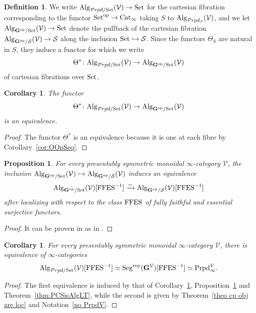 \documentclass{amsart}
\numberwithin{theorem}{subsection}
\newtheorem{propn}[theorem]{Proposition}
\newtheorem{cor}[theorem]{Corollary}
\theoremstyle{definition}
\newtheorem{defn}[theorem]{Definition}
\providecommand{\op}{\mathrm{op}}
\newcommand{\xS}{\mathcal{S}}
\newcommand{\xV}{\mathcal{V}}
\newcommand{\icat}{$\infty$-category}
\newcommand{\isoto}{\xrightarrow{\sim}}
\newcommand{\name}[1]{\ensuremath{\text{\textup{#1}}}}
\newcommand{\bbY}{\mathbf{G}}
\newcommand{\bbYV}{\bbY^{\xV}}
\newcommand{\Set}{\name{Set}}
\newcommand{\Seg}{\name{Seg}}
\newcommand{\Cat}{\name{Cat}}
\newcommand{\CatI}{\Cat_{\infty}}
\newcommand{\Alg}{\name{Alg}}
\newcommand{\AlgPrdSet}{\name{Alg}_{\mathcal{P}rpd/\Set}}
\newcommand{\Segrep}{\Seg^{\name{rep}}}
\newcommand{\calproperad}{\mathcal{P}rpd}
\newcommand{\nmproperad}{\name{Prpd}}
\begin{document}
\begin{defn}
We write $\AlgPrdSet(\xV) \to \Set$ for the cartesian fibration corresponding to the functor $\Set^{\op} \to \CatI$ taking $S$ to $\Alg_{\calproperad_{S}}(\xV)$, and we let $\Alg_{\bbY^\op/\Set}(\xV) \to \Set$ denote the pullback of the cartesian fibration $\Alg_{\bbY^\op/\xS}(\xV)	\to \xS$ along the inclusion $\Set \hookrightarrow \xS$.
Since the functors $\Theta_{S}$ are natural in $S$, they induce a functor for which we write
\[\Theta^{*} \colon
\AlgPrdSet(\xV) \to
\Alg_{\bbY^\op/\Set}(\xV)\]
of cartesian fibrations over $\Set$.
\end{defn}

\begin{cor}\label{cor:AlgOpdeq}
	The functor \[\Theta^{*} \colon
	\AlgPrdSet(\xV) \to
	\Alg_{\bbY^\op/\Set}(\xV)\] is an equivalence.
\end{cor}
\begin{proof}
	The functor $\Theta^*$ is an equivalence because it is one at each fibre by Corollary~\ref{cor:OOpSeq}. 
\end{proof}

\begin{propn}\label{propn:FFESSet}
	For every presentably symmetric monoidal \icat{} $\xV$,	the inclusion $\Alg_{\bbY^\op/\Set}(\xV) \hookrightarrow
	\Alg_{\bbY^\op/\xS}(\xV)$ induces an equivalence
	\[ \Alg_{\bbY^\op/\Set}(\xV)[\name{FFES}^{-1}] \isoto
	\Alg_{\bbY^\op/\xS}(\xV)[\name{FFES}^{-1}]\]
	after localizing with respect to the class $\name{FFES}$ of fully faithful and essential surjective functors.
\end{propn}
\begin{proof}
It can be proven in as in \cite[Theorem 5.3.17]{enriched}.
\end{proof}

\begin{cor}\label{cor AlgPrd=PCSbbY}
	For every presentably symmetric monoidal \icat{} $\xV$, there is equivalence of $\infty$-categories
	\[ \AlgPrdSet(\xV)[\name{FFES}^{-1}]\simeq \Segrep(\bbYV)[\name{FFES}^{-1}]\simeq \nmproperad_\infty^\xV.\]
\end{cor}
\begin{proof}
The first equivalence is induced by that of Corollary~\ref{cor:AlgOpdeq}, Proposition~\ref{propn:FFESSet} and Theorem~\ref{thm:PCSisAlgLT}, while the second is given by Theorem~\ref{theo cp obj are loc} and Notation~\ref{no PrpdV}.
\end{proof}
\end{document}
